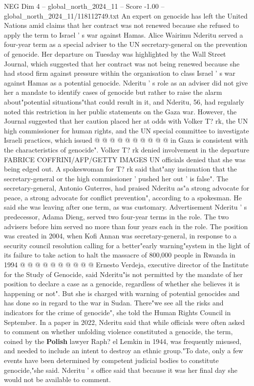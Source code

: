 \begin{textsample}{NEG Dim 4 – global\_north\_2024\_11 – Score -1.00 – global\_north\_2024\_11/118112749.txt}  \label{ex:f4_neg_161}
An expert on genocide has left the United Nations amid claims that her contract was not renewed because she refused to apply the term to Israel ' s war against Hamas.
Alice Wairimu Nderitu served a four-year term as a special adviser to the UN secretary-general on the prevention of genocide.
Her departure on Tuesday was highlighted by the Wall Street Journal, which suggested that her contract was not being renewed because she had stood firm against pressure within the organisation to class Israel ' s war against Hamas as a potential genocide.
Nderitu ' s role as an adviser did not give her a mandate to identify cases of genocide but rather to raise the alarm about"potential situations"that could result in it, and Nderitu, 56, had regularly noted this restriction in her public statements on the Gaza war.
However, the Journal suggested that her caution placed her at odds with Volker T? rk, the UN high commissioner for human rights, and the UN special committee to investigate Israeli practices, which issued @ @ @ @ @ @ @ @ @ @ in Gaza is consistent with the characteristics of genocide".
Volker T? rk denied involvement in the departure FABRICE COFFRINI/AFP/GETTY IMAGES UN officials denied that she was being edged out.
A spokeswoman for T? rk said that"any insinuation that the secretary-general or the high commissioner ' pushed her out ' is false".
The secretary-general, Antonio Guterres, had praised Nderitu as"a strong advocate for peace, a strong advocate for conflict prevention", according to a spokesman.
He said she was leaving after one term, as was customary.
Advertisement Nderitu ' s predecessor, Adama Dieng, served two four-year terms in the role.
The two advisers before him served no more than four years each in the role.
The position was created in 2004, when Kofi Annan was secretary-general, in response to a security council resolution calling for a better"early warning"system in the light of its failure to take action to halt the massacre of 800,000 people in Rwanda in 1994 @ @ @ @ @ @ @ @ @ @ Ernesto Verdeja, executive director of the Institute for the Study of Genocide, said Nderitu"is not permitted by the mandate of her position to declare a case as a genocide, regardless of whether she believes it is happening or not".
But she is charged with warning of potential genocides and has done so in regard to the war in Sudan.
There"we see all the risks and indicators for the crime of genocide", she told the Human Rights Council in September.
In a paper in 2022, Nderitu said that while officials were often asked to comment on whether unfolding violence constituted a genocide, the term, coined by the \textbf{Polish} lawyer Raph? el Lemkin in 1944, was frequently misused, and needed to include an intent to destroy an ethnic group."To date, only a few events have been determined by competent judicial bodies to constitute genocide,"she said.
Nderitu ' s office said that because it was her final day she would not be available to comment.

\end{textsample}
